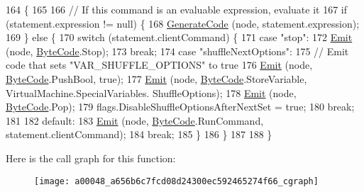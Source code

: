 \begin{DoxyCode}
164                                                                      \{
165 
166             \textcolor{comment}{// If this command is an evaluable expression, evaluate it}
167             \textcolor{keywordflow}{if} (statement.expression != null) \{
168                 \hyperlink{a00048_a006f3becd521cc179ba3d3352f6f930b}{GenerateCode} (node, statement.expression);
169             \} \textcolor{keywordflow}{else} \{
170                 \textcolor{keywordflow}{switch} (statement.clientCommand) \{
171                 \textcolor{keywordflow}{case} \textcolor{stringliteral}{"stop"}:
172                     \hyperlink{a00048_a774e8c143cdda0584fcfdda98626a83c}{Emit} (node, \hyperlink{a00045_ad5dfb6ee68ca7469623ad3e459f98894}{ByteCode}.Stop);
173                     \textcolor{keywordflow}{break};
174                 \textcolor{keywordflow}{case} \textcolor{stringliteral}{"shuffleNextOptions"}:
175                     \textcolor{comment}{// Emit code that sets "VAR\_SHUFFLE\_OPTIONS" to true}
176                     \hyperlink{a00048_a774e8c143cdda0584fcfdda98626a83c}{Emit} (node, \hyperlink{a00045_ad5dfb6ee68ca7469623ad3e459f98894}{ByteCode}.PushBool, \textcolor{keyword}{true});
177                     \hyperlink{a00048_a774e8c143cdda0584fcfdda98626a83c}{Emit} (node, \hyperlink{a00045_ad5dfb6ee68ca7469623ad3e459f98894}{ByteCode}.StoreVariable, VirtualMachine.SpecialVariables.
      ShuffleOptions);
178                     \hyperlink{a00048_a774e8c143cdda0584fcfdda98626a83c}{Emit} (node, \hyperlink{a00045_ad5dfb6ee68ca7469623ad3e459f98894}{ByteCode}.Pop);
179                     flags.DisableShuffleOptionsAfterNextSet = \textcolor{keyword}{true};
180                     \textcolor{keywordflow}{break};
181 
182                 \textcolor{keywordflow}{default}:
183                     \hyperlink{a00048_a774e8c143cdda0584fcfdda98626a83c}{Emit} (node, \hyperlink{a00045_ad5dfb6ee68ca7469623ad3e459f98894}{ByteCode}.RunCommand, statement.clientCommand);
184                     \textcolor{keywordflow}{break};
185                 \}
186             \}
187 
188         \}
\end{DoxyCode}


Here is the call graph for this function\-:
\nopagebreak
\begin{figure}[H]
\begin{center}
\leavevmode
\texttt{[image: a00048\_a656b6c7fcd08d24300ec592465274f66\_cgraph]}
\end{center}
\end{figure}


